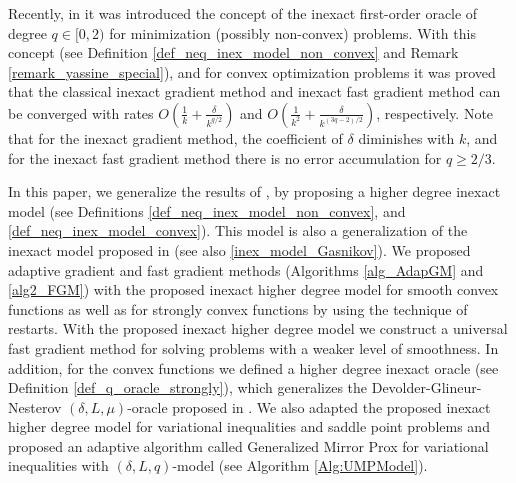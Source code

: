 \documentclass[11pt]{amsart}
\theoremstyle{definition}
\numberwithin{equation}{section}
\begin{document}
Recently, in \cite{Nabou2024qoracle} it was introduced the concept of the inexact first-order oracle of degree $q \in [0,2)$ for minimization (possibly non-convex) problems. With this concept (see Definition \ref{def_neq_inex_model_non_convex} and Remark \ref{remark_yassine_special}), and for convex optimization problems it was proved that the classical inexact gradient method and inexact fast gradient method can be converged with rates $O\left(\frac{1}{k} + \frac{\delta}{k^{q/2}}\right)$ and $O\left(\frac{1}{k^2} + \frac{\delta}{k^{(3q-2)/2}}\right)$, respectively. Note that for the inexact gradient method, the coefficient of $\delta$ diminishes with $k$, and for the inexact fast gradient method there is no error accumulation for $q \geq 2/3$.

In this paper, we generalize the results of \cite{Nabou2024qoracle}, by proposing a higher degree inexact model (see Definitions \ref{def_neq_inex_model_non_convex}, and \ref{def_neq_inex_model_convex}). This model is also a generalization of the inexact model proposed in \cite{Gasnikov2019fast,Stonyakin2021OMS} (see also \eqref{inex_model_Gasnikov}). We proposed adaptive gradient and fast gradient methods (Algorithms \ref{alg_AdapGM} and \ref{alg2_FGM}) with the proposed inexact higher degree model for smooth convex functions as well as for strongly convex functions by using the technique of restarts. With the proposed inexact higher degree model we construct a universal fast gradient method for solving problems with a weaker level of smoothness. In addition, for the convex functions we defined a higher degree inexact oracle (see Definition \ref{def_q_oracle_strongly}), which generalizes the Devolder-Glineur-Nesterov $(\delta, L, \mu)$-oracle proposed in \cite{Devolder2013strongly}. We also adapted the proposed inexact higher degree model for variational inequalities and saddle point problems and proposed an adaptive algorithm called Generalized Mirror Prox for variational inequalities with $(\delta, L, q)$-model (see Algorithm \ref{Alg:UMPModel}).
\end{document}
